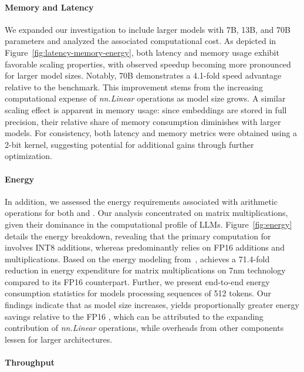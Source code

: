 \paragraph{Memory and Latency}

We expanded our investigation to include larger models with 7B, 13B, and 70B parameters and analyzed the associated computational cost. As depicted in Figure~\ref{fig:latency-memory-energy}, both latency and memory usage exhibit favorable scaling properties, with observed speedup becoming more pronounced for larger model sizes. Notably,  70B demonstrates a 4.1-fold speed advantage relative to the  benchmark. This improvement stems from the increasing computational expense of \emph{nn.Linear} operations as model size grows. A similar scaling effect is apparent in memory usage: since embeddings are stored in full precision, their relative share of memory consumption diminishes with larger models. For consistency, both latency and memory metrics were obtained using a 2-bit kernel, suggesting potential for additional gains through further optimization.

\paragraph{Energy}

In addition, we assessed the energy requirements associated with arithmetic operations for both  and . Our analysis concentrated on matrix multiplications, given their dominance in the computational profile of LLMs. Figure~\ref{fig:energy} details the energy breakdown, revealing that the primary computation for  involves INT8 additions, whereas  predominantly relies on FP16 additions and multiplications. Based on the energy modeling from~\cite{energycost, pokebnn},  achieves a 71.4-fold reduction in energy expenditure for matrix multiplications on 7nm technology compared to its FP16 counterpart. Further, we present end-to-end energy consumption statistics for models processing sequences of 512 tokens. Our findings indicate that as model size increases,  yields proportionally greater energy savings relative to the FP16 , which can be attributed to the expanding contribution of \emph{nn.Linear} operations, while overheads from other components lessen for larger architectures.

\paragraph{Throughput}

